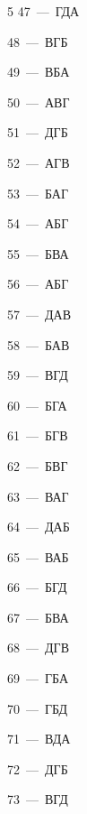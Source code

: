 \documentclass[12pt]{article}
\begin{document}
\begin{multicols}{5}
\mbox{47~--- ГДА}\par
\mbox{48~--- ВГБ}\par
\mbox{49~--- ВБА}\par
\mbox{50~--- АВГ}\par
\mbox{51~--- ДГБ}\par
\mbox{52~--- АГВ}\par
\mbox{53~--- БАГ}\par
\mbox{54~--- АБГ}\par
\mbox{55~--- БВА}\par
\mbox{56~--- АБГ}\par
\mbox{57~--- ДАВ}\par
\mbox{58~--- БАВ}\par
\mbox{59~--- ВГД}\par
\mbox{60~--- БГА}\par
\mbox{61~--- БГВ}\par
\mbox{62~--- БВГ}\par
\mbox{63~--- ВАГ}\par
\mbox{64~--- ДАБ}\par
\mbox{65~--- ВАБ}\par
\mbox{66~--- БГД}\par
\mbox{67~--- БВА}\par
\mbox{68~--- ДГВ}\par
\mbox{69~--- ГБА}\par
\mbox{70~--- ГБД}\par
\mbox{71~--- ВДА}\par
\mbox{72~--- ДГБ}\par
\mbox{73~--- ВГД}
\end{multicols}\par\vspace{0.2cm}
\end{document}
